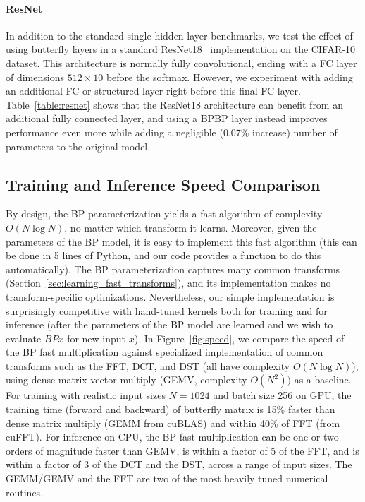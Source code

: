 \paragraph{ResNet}

In addition to the standard single hidden layer benchmarks, we test the effect of using butterfly layers in a standard ResNet18~\citep{he2016deep} implementation on the CIFAR-10 dataset. This architecture is normally fully convolutional, ending with a FC layer of dimensions $512 \times 10$ before the softmax. However, we experiment with adding an additional FC or structured layer right before this final FC layer.
Table~\ref{table:resnet} shows that the ResNet18 architecture can benefit from an additional fully connected layer, and using a BPBP layer instead improves performance even more while adding a negligible (0.07\% increase) number of parameters to the original model.

\subsection{Training and Inference Speed Comparison}
\label{sec:speed}

By design, the BP parameterization yields a fast algorithm of complexity $O(N \log N)$, no matter which transform it learns. Moreover, given the parameters of the BP model, it is easy to implement this fast algorithm (this can be done in 5 lines of Python, and our code provides a function to do this automatically). The BP parameterization captures many common transforms
(Section~\ref{sec:learning_fast_transforms}), and its implementation makes no transform-specific optimizations. Nevertheless, our simple implementation is surprisingly competitive with hand-tuned kernels both for training and for inference (after the parameters of the BP model are learned and we wish to evaluate $BPx$ for new input $x$). In Figure~\ref{fig:speed}, we compare the speed of the BP fast multiplication against specialized implementation of common transforms such as the FFT, DCT, and DST (all have complexity $O(N \log N)$), using dense matrix-vector multiply (GEMV, complexity $O(N^2))$ as a baseline. For training with realistic input sizes $N = 1024$ and batch size 256 on GPU, the training time (forward and backward) of butterfly matrix is 15\% faster than dense matrix multiply (GEMM from cuBLAS) and within 40\% of FFT (from cuFFT). For inference on CPU, the BP fast multiplication can be one or two orders of magnitude faster than GEMV, is within a factor of 5 of the FFT, and is within a factor of 3 of the DCT and the DST, across a range of input sizes. The GEMM/GEMV and the FFT are two of the most heavily tuned numerical routines.

